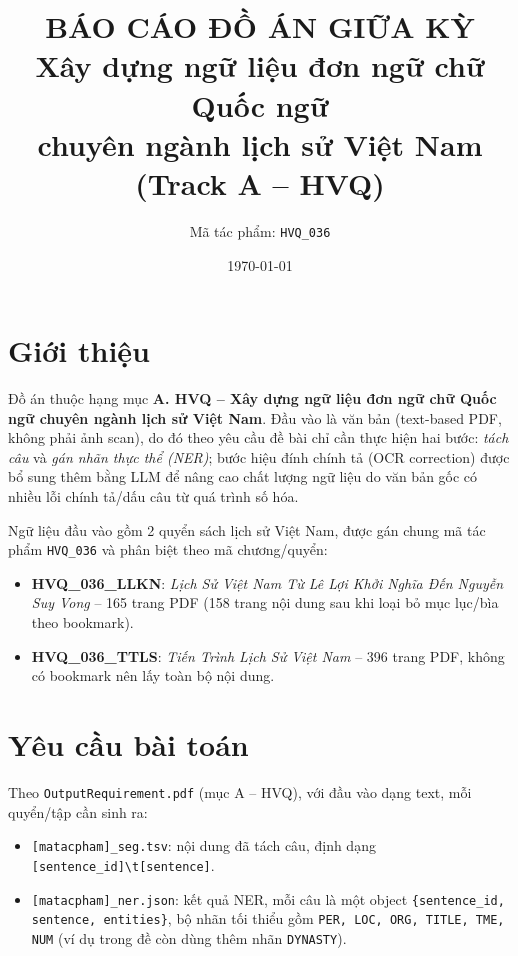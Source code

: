 \documentclass[12pt,a4paper]{article}
\title{\textbf{BÁO CÁO ĐỒ ÁN GIỮA KỲ\\
Xây dựng ngữ liệu đơn ngữ chữ Quốc ngữ\\
chuyên ngành lịch sử Việt Nam (Track A -- HVQ)}}
\author{Mã tác phẩm: \texttt{HVQ\_036}}
\date{\today}
\begin{document}
\maketitle
\tableofcontents

\section{Giới thiệu}

Đồ án thuộc hạng mục \textbf{A. HVQ -- Xây dựng ngữ liệu đơn ngữ chữ Quốc ngữ
chuyên ngành lịch sử Việt Nam}. Đầu vào là văn bản (text-based PDF, không phải
ảnh scan), do đó theo yêu cầu đề bài chỉ cần thực hiện hai bước: \emph{tách câu}
và \emph{gán nhãn thực thể (NER)}; bước hiệu đính chính tả (OCR correction)
được bổ sung thêm bằng LLM để nâng cao chất lượng ngữ liệu do văn bản gốc có
nhiều lỗi chính tả/dấu câu từ quá trình số hóa.

Ngữ liệu đầu vào gồm 2 quyển sách lịch sử Việt Nam, được gán chung mã tác phẩm
\texttt{HVQ\_036} và phân biệt theo mã chương/quyển:

\begin{itemize}
  \item \textbf{HVQ\_036\_LLKN}: \emph{Lịch Sử Việt Nam Từ Lê Lợi Khởi Nghĩa
    Đến Nguyễn Suy Vong} -- 165 trang PDF (158 trang nội dung sau khi loại bỏ
    mục lục/bìa theo bookmark).
  \item \textbf{HVQ\_036\_TTLS}: \emph{Tiến Trình Lịch Sử Việt Nam} -- 396
    trang PDF, không có bookmark nên lấy toàn bộ nội dung.
\end{itemize}

\section{Yêu cầu bài toán}

Theo \texttt{OutputRequirement.pdf} (mục A -- HVQ), với đầu vào dạng text, mỗi
quyển/tập cần sinh ra:

\begin{itemize}
  \item \texttt{[matacpham]\_seg.tsv}: nội dung đã tách câu, định dạng
    \texttt{[sentence\_id]\textbackslash t[sentence]}.
  \item \texttt{[matacpham]\_ner.json}: kết quả NER, mỗi câu là một object
    \texttt{\{sentence\_id, sentence, entities\}}, bộ nhãn tối thiểu gồm
    \texttt{PER, LOC, ORG, TITLE, TME, NUM} (ví dụ trong đề còn dùng thêm nhãn
    \texttt{DYNASTY}).
\end{itemize}
\end{document}
